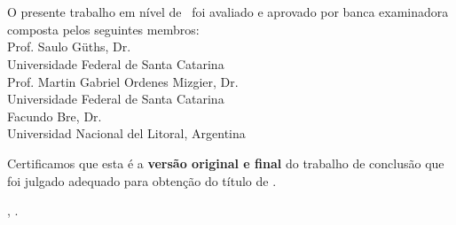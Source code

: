 \imprimircapa

\imprimirfolhaderosto*

\begin{fichacatalografica}
	
\end{fichacatalografica}

\begin{folhadeaprovacao}
	\OnehalfSpacing
	\centering
	\imprimirautor\\%
	\vspace*{10pt}		
	\textbf{\imprimirtitulo}%
	\ifnotempty{\imprimirsubtitulo}{:~\imprimirsubtitulo}\\%
	\vspace*{\baselineskip}
	O presente trabalho em nível de \imprimirnivel~foi avaliado e aprovado por banca examinadora composta pelos seguintes membros:\\
	\vspace*{\baselineskip}
	Prof. Saulo Güths, Dr.\\
	Universidade Federal de Santa Catarina\\
	\vspace*{\baselineskip}
	Prof. Martin Gabriel Ordenes Mizgier, Dr.\\
	Universidade Federal de Santa Catarina\\
	\vspace*{\baselineskip}
	Facundo Bre, Dr.\\
	Universidad Nacional del Litoral, Argentina\\
	\vspace*{2\baselineskip}
	\begin{minipage}{\textwidth}
		Certificamos que esta é a \textbf{versão original e final} do trabalho de conclusão que foi julgado adequado para obtenção do título de \imprimirformacao.\\
	\end{minipage}
	\vspace*{\fill}
	\vspace*{\fill}
	\assinatura{\OnehalfSpacing\imprimirorientador \\ \imprimirorientadorRotulo}
	\vspace*{\fill}
	\imprimirlocal, \imprimirdata.
\end{folhadeaprovacao}

